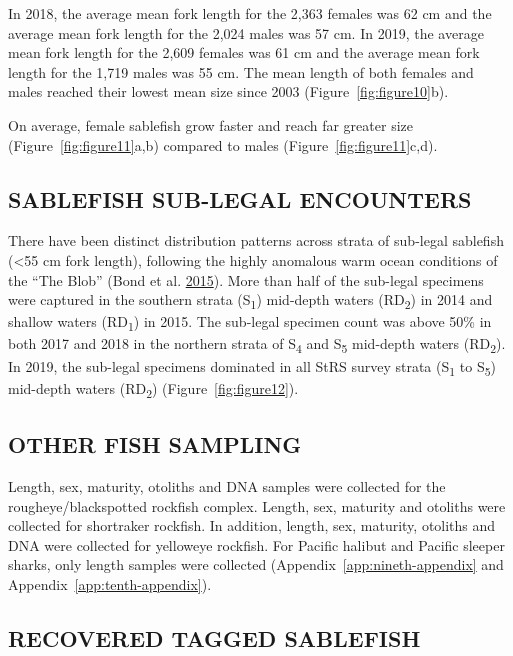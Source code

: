 \documentclass[12pt]{article}\usepackage[]{graphicx}\usepackage[]{color}
\begin{document}
In 2018, the average mean fork length for the 2,363 females was 62 cm and the average mean fork length for the 2,024 males was 57 cm. In 2019, the average mean fork length for the 2,609 females was 61 cm and the average mean fork length for the 1,719 males was 55 cm. The mean length of both females and males reached their lowest mean size since 2003 (Figure~\ref{fig:figure10}b).

On average, female sablefish grow faster and reach far greater size (Figure~\ref{fig:figure11}a,b) compared to males (Figure~\ref{fig:figure11}c,d).

\hypertarget{sablefish-sub-legal-encounters}{%
\subsection{SABLEFISH SUB-LEGAL ENCOUNTERS}\label{sablefish-sub-legal-encounters}}

There have been distinct distribution patterns across strata of sub-legal sablefish (\textless55 cm fork length), following the highly anomalous warm ocean conditions of the ``The Blob'' (Bond et al. \protect\hyperlink{ref-Bond2015}{2015}). More than half of the sub-legal specimens were captured in the southern strata (S\textsubscript{1}) mid-depth waters (RD\textsubscript{2}) in 2014 and shallow waters (RD\textsubscript{1}) in 2015. The sub-legal specimen count was above 50\% in both 2017 and 2018 in the northern strata of S\textsubscript{4} and S\textsubscript{5} mid-depth waters (RD\textsubscript{2}). In 2019, the sub-legal specimens dominated in all StRS survey strata (S\textsubscript{1} to S\textsubscript{5}) mid-depth waters (RD\textsubscript{2}) (Figure~\ref{fig:figure12}).

\hypertarget{other-fish-sampling}{%
\subsection{OTHER FISH SAMPLING}\label{other-fish-sampling}}

Length, sex, maturity, otoliths and DNA samples were collected for the rougheye/blackspotted rockfish complex. Length, sex, maturity and otoliths were collected for shortraker rockfish. In addition, length, sex, maturity, otoliths and DNA were collected for yelloweye rockfish. For Pacific halibut and Pacific sleeper sharks, only length samples were collected (Appendix~\ref{app:nineth-appendix} and Appendix~\ref{app:tenth-appendix}).

\hypertarget{recovered-tagged-sablefish}{%
\subsection{RECOVERED TAGGED SABLEFISH}\label{recovered-tagged-sablefish}}
\end{document}
